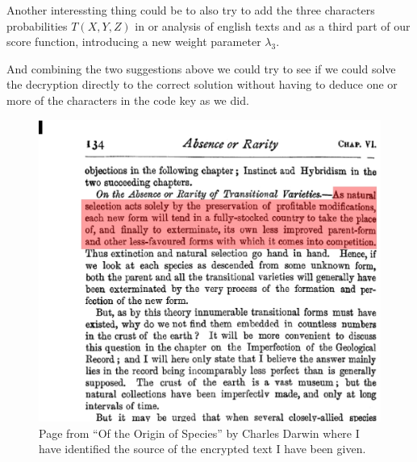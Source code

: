 \documentclass[a4paper, 11pt]{article}
\begin{document}
Another interessting thing could be to also try to add the three characters
probabilities $T(X,Y,Z)$ in or analysis of english texts and as a third part of
our score function, introducing a new weight parameter $\lambda_3$.

And combining the two suggestions above we could try to see if we could 
solve the decryption directly to the correct solution without having to 
deduce one or more of the characters in the code key as we did.

\begin{figure}[h!]
  \centering
  \includegraphics[width=1.0\textwidth]{decrypted_text_source_Darwin_OriginOfSpieces.eps}
  \caption{Page from ``Of the Origin of Species'' by Charles Darwin where I
  have identified the source of the encrypted text I have been given.}
  \label{fig:Darwin}
\end{figure}



\newpage
\end{document}
